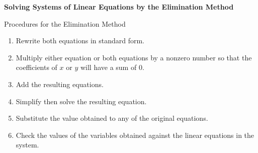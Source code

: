 \begin{center}
\textbf{Solving Systems of Linear Equations by the Elimination Method}
\end{center}

\vspace*{1ex}

Procedures for the Elimination Method 
\begin{enumerate}[label = \arabic*. ]
\item Rewrite both equations in standard form. 
\item Multiply either equation or both equations by a nonzero number so that the coefficients of $x$ or $y$ will have a sum of 0.
\item Add the resulting equations.
\item Simplify then solve the resulting equation.
\item Substitute the value obtained to any of the original equations. 
\item Check the values of the variables obtained against the linear equations in the system. 
\end{enumerate} 
 